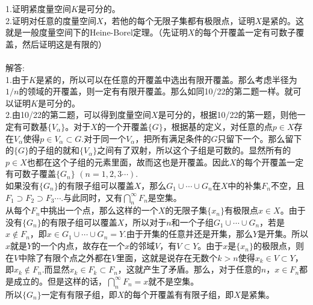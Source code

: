 \documentclass[11pt,a4paper,openany]{article} \usepackage{amssymb,amsfonts, amsmath,ctex,bm}
\begin{document}
\noindent 1.证明紧度量空间$K$是可分的。\\
2.证明对任意的度量空间$X$，若他的每个无限子集都有极限点，证明$X$是紧的。这就是一般度量空间下的Heine-Borel定理。（先证明$X$的每个开覆盖一定有可数子覆盖，然后证明这是有限的）
\\
\\
解答:\\
1.由于$K$是紧的，所以可以在任意的开覆盖中选出有限开覆盖。那么考虑半径为$1/n$的领域的开覆盖，则一定有有限开覆盖。那么如同10/22的第二题一样。就可以证明$K$是可分的。\\
2.由10/22的第二题，可以得到度量空间$X$是可分的，根据10/22的第一题，则他一定有可数基$\{V_\alpha\}$。对于$X$的一个开覆盖$\{G\}$，根据基的定义，对任意的点$p \in X$存在$V_\alpha$使得$p\in V_\alpha \subset G $.对于同一个$V_\alpha$，把所有满足条件的$G$只留下一个。那么留下的$\{G\}$的子组的就和$\{V_\alpha\}$之间有了双射，所以这个子组是可数的。显然所有的$p\in X$也都在这个子组的元素里面，故而这也是开覆盖。因此$X$的每个开覆盖一定有可数子覆盖$\{G_n\}$ $(n=1,2,3\cdots)$.\\\indent 如果没有$\{G_n\}$的有限子组可以覆盖$X$，那么$G_1\cup \cdots \cup G_n$在$X$中的补集$F_n$不空，且$F_1\supset F_2 \supset F_3 \cdots $.与此同时，又有$\bigcap_n^\infty F_n$是空集。\\
\indent 从每个$F_n$中挑出一个点，那么这样的一个$X$的无限子集$\{x_n\}$有极限点$x\in X$。由于没有$\{G_n\}$的有限子组可以覆盖$X$，所以对于$n$和一个子组$G_1\cup \cdots \cup G_n$，若是$x \notin F_n$，即$x\in G_1\cup \cdots \cup G_n=Y$.由于开集的任意并还是开集，那么$Y$是开集。所以$x$就是$Y$的一个内点，故存在一个$x$的邻域$V$，有$V\subset Y$。由于$x$是$\{x_n\}$的极限点，则在$V$中除了有限个点之外都在$V$里面，这就是说存在无数个$k>n$使得$x_k \in V \subset Y$，即$x_k \notin F_n$.而显然$x_k\in F_k\subset F_n$，这就产生了矛盾。那么，对于任意的$n$，$x\in F_n$都是成立的。但是这样的话，$\bigcap_n^\infty F_n={x}$就不是空集。\\\indent 所以$\{G_n\}$一定有有限子组，即$X$的每个开覆盖有有限子组，即$X$是紧集。
\end{document}
